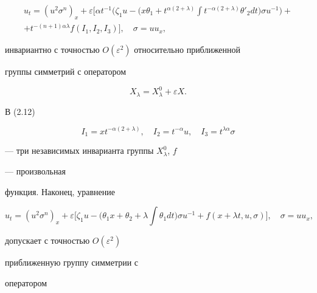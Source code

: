 \begin{multline}


u_t=(u^2\sigma^n)_x+\varepsilon\biggl[ \alpha t^{-1}\biggl(


\zeta_1u-\biggl(x\theta_1+t^{\alpha(2+\lambda)}


\int t^{-\alpha(2+\lambda)}\theta'_2dt\biggr) \sigma u^{-1}


\biggr)+\\


+t^{-(n+1)\alpha\lambda}f(I_1,I_2,I_3)\biggr],\quad


\sigma=uu_x, \tag{2.11}


\end{multline}


инвариантно с точностью $O(\varepsilon^2)$ относительно приближенной


группы симметрий с оператором


\begin{equation}


X_\lambda=X^0_\lambda+\varepsilon X.\tag{2.12}


\end{equation}


В (2.12)


\begin{equation}


I_1=xt^{-\alpha(2+\lambda)},\quad I_2=t^{-\alpha}u,\quad


I_3=t^{\lambda\alpha}\sigma \tag{2.13}


\end{equation}


--- три независимых инварианта группы $X^0_\lambda$, $f$


--- произвольная


функция. Наконец, уравнение


\begin{equation}


u_t=(u^2\sigma^n)_x+\varepsilon


\biggl[\zeta_1u-\biggl(\theta_1x+\theta_2+\lambda \int


\theta_1dt\biggr)\sigma u^{-1}+f(x+\lambda t,u,\sigma)


\biggr],\quad \sigma=uu_x, \tag{2.14}


\end{equation}


допускает с точностью $O(\varepsilon^2)$


приближенную группу симметрии с


оператором



